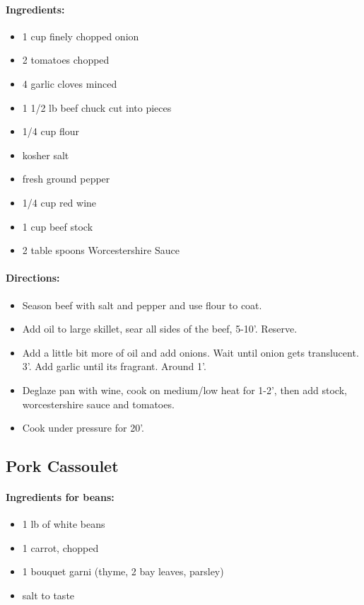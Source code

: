 \documentclass{article}
\begin{document}
\paragraph{Ingredients:}
\begin{itemize}
  \item 1 cup finely chopped onion
  \item 2 tomatoes chopped
  \item 4 garlic cloves minced
  \item 1 1/2 lb beef chuck cut into pieces
  \item 1/4 cup flour
  \item kosher salt
  \item fresh ground pepper
  \item 1/4 cup red wine
  \item 1 cup beef stock
  \item 2 table spoons Worcestershire Sauce	
\end{itemize}

\paragraph{Directions:}
\begin{itemize}
  \item Season beef with salt and pepper and use flour to coat.
  \item Add oil to large skillet, sear all sides of the beef, 5-10’. Reserve.
  \item Add a little bit more of oil and add onions. Wait until onion gets translucent. 3’. Add garlic until its
fragrant. Around 1’.
  \item Deglaze pan with wine, cook on medium/low heat for 1-2’, then add stock, worcestershire sauce and
tomatoes.
  \item Cook under pressure for 20’.
\end{itemize}

\subsection{Pork Cassoulet}

\paragraph{Ingredients for beans:}
\begin{itemize}
	\item 1 lb of white beans
	\item 1 carrot, chopped
	\item 1 bouquet garni (thyme, 2 bay leaves, parsley)
	\item salt to taste
\end{itemize}
\end{document}
